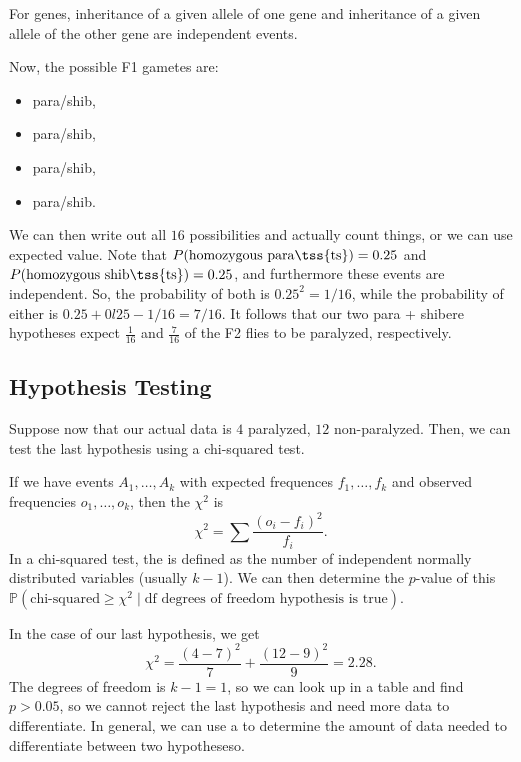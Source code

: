 \begin{law}
	For  genes, inheritance of a given allele of one gene and inheritance of a given allele of the other gene are independent events.
\end{law}

Now, the possible F1 gametes are:

\begin{itemize}
	\item para/shib,
	\item para/shib,
	\item para/shib, 
	\item para/shib.
\end{itemize}

We can then write out all $16$ possibilities and actually count things, or we can use expected value. Note that $P(\text{homozygous para\tss{ts}}) = 0.25$ and $P(\text{homozygous shib\tss{ts}}) = 0.25$, and furthermore these events are independent. So, the probability of both is $0.25^2 = 1/16$, while the probability of either is $0.25 + 0l25 - 1/16 = 7/16$. It follows that our two para + shibere hypotheses expect $\frac 1{16}$ and $\frac 7{16}$ of the F2 flies to be paralyzed, respectively.

\subsection{Hypothesis Testing}

Suppose now that our actual data is $4$ paralyzed, $12$ non-paralyzed. Then, we can test the last hypothesis using a chi-squared test.

\begin{defn}
	If we have events $A_1, \ldots, A_k$ with expected frequences $f_1,\ldots, f_k$ and observed frequencies $o_1, \ldots, o_k$, then the  $\chi^2$ is \[
		\chi^2 = \sum \frac{(o_i-f_i)^2}{f_i}.
	\]
	In a chi-squared test, the  is defined as the number of independent normally distributed variables (usually $k-1$). We can then determine the $p$-value of this $\mathbb P(\text{chi-squared} \geq \chi^2 \mid \text{df degrees of freedom hypothesis is true})$. 
\end{defn}

In the case of our last hypothesis, we get \[
	\chi^2 = \frac{(4-7)^2}{7} + \frac{(12-9)^2}{9} = 2.28.
\]
The degrees of freedom is $k-1 = 1$, so we can look up in a table and find $p > 0.05$, so we cannot reject the last hypothesis and need more data to differentiate. In general, we can use a  to determine the amount of data needed to differentiate between two hypotheseso.

